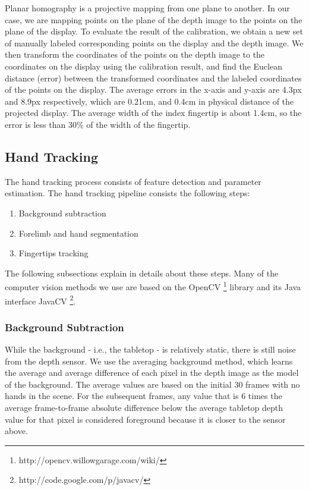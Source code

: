 Planar homography is a projective mapping from one plane to another. In our
case, we are mapping points on the plane of the depth image to the points
on the plane of the display. To evaluate the result of the calibration, we
obtain a new set of manually labeled corresponding points on the display and the
depth image. We then transform the coordinates of the points on the depth image
to the coordinates on the display using the calibration result, and find the
Euclean distance (error) between the transformed coordinates and the labeled
coordinates of the points on the display. The average errors in the x-axis and
y-axis are 4.3px and 8.9px respectively, which are 0.21cm, and 0.4cm in physical distance of the
projected display. The average width of the index fingertip is about 1.4cm, so
the error is less than 30\% of the width of the fingertip. 

\subsection{Hand Tracking}
The hand tracking process consists of feature detection and parameter estimation. The hand tracking
pipeline consists the following steps:

\begin{enumerate}
  \item Background subtraction
  \item Forelimb and hand segmentation
  \item Fingertips tracking
\end{enumerate}

The following subsections explain in details about these steps. Many of the
computer vision methods we use are based on the OpenCV
\footnote{http://opencv.willowgarage.com/wiki/} library and its Java interface 
JavaCV \footnote{http://code.google.com/p/javacv/}.

\subsubsection{Background Subtraction}
While the background - i.e., the tabletop - is relatively static, there is
still noise from the depth sensor. We use the averaging background method, which
learns the average and average difference of each pixel in the depth image as
the model of the background. The average values are based on the initial 30
frames with no hands in the scene. For the subsequent frames, any value that is 
6 times the average frame-to-frame absolute difference below the average tabletop depth value for that pixel is considered 
foreground because it is closer to the sensor above.

